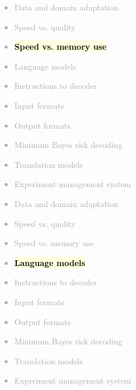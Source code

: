 \documentclass[landscape]{uedslides2C}
\newcommand{\currenttopic}[1]{\colorbox{lightyellow}{\textcolor{black}{\bf #1}}}
\begin{document}

\vspace{-5mm}
\textcolor{darkgrey}{
\begin{itemize} \itemsep -1mm
\item Data and domain adaptation
\item Speed vs. quality
\item \currenttopic{Speed vs. memory use}
\item Language models
\item Instructions to decoder
\item Input formats
\item Output formats
\item Minimum Bayes risk decoding
\item Translation models
\item Experiment management system
\end{itemize}
}


\vspace{-5mm}
\textcolor{darkgrey}{
\begin{itemize} \itemsep -1mm
\item Data and domain adaptation
\item Speed vs. quality
\item Speed vs. memory use
\item \currenttopic{Language models}
\item Instructions to decoder
\item Input formats
\item Output formats
\item Minimum Bayes risk decoding
\item Translation models
\item Experiment management system
\end{itemize}
}

\end{document}
